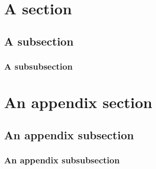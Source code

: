 \documentclass[10pt,twoside,fleqn,french,english]{actuecon}
\author{First Author}
\affil{First Author's Affiliation}
\author{Second Author}
\affil{Second Author's Affiliation}
\date{} %
\begin{document}
	
	
	\captionsetup[table]{format=actuecon}
	\captionsetup[figure]{format=actuecon}
	
	\setcounter{page}{3}
	
	
	\maketitle
	\thispagestyle{empty}			
	
	\begin{AEresume}
	\end{AEresume}

	\begin{AEabstract}
	\end{AEabstract}

	\AEintroduction
	
		       	
	\AEsectionsDeveloppement
	
		\section{A section}
						
		\subsection{A subsection}
								 
		\subsubsection{A subsubsection}
				
	\AEconclusion
	
		
	\AEannexe
	
		\section{An appendix section}
		
		\subsection{An appendix subsection}
		
		\subsubsection{An appendix subsubsection}
							
	\AEbibliographie
	
	
		
\end{document}
